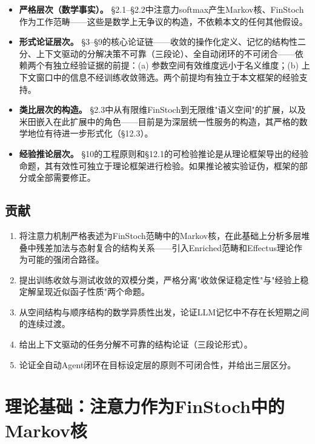 \documentclass[11pt,a4paper]{ctexart}
\begin{document}
\begin{itemize}[leftmargin=*]
    \item \textbf{严格层次（数学事实）。} §2.1--§2.2中注意力softmax产生Markov核、FinStoch作为工作范畴——这些是数学上无争议的构造，不依赖本文的任何其他假设。
    \item \textbf{形式论证层次。} §3--§9的核心论证链——收敛的操作化定义、记忆的结构性二分、上下文驱动的分解决策不可靠（三段论）、全自动闭环的不可闭合——依赖两个有独立经验证据的前提：(a) 参数空间有效维度远小于名义维度\cite{Li2018IntrinsicDim,Aghajanyan2020,Hu2021LoRA}；(b) 上下文窗口中的信息不经训练收敛筛选。两个前提均有独立于本文框架的经验支持。
    \item \textbf{类比层次的构造。} §2.3中从有限维FinStoch到无限维"语义空间"的扩展，以及米田嵌入在此扩展中的角色——目前是为深层统一性服务的构造，其严格的数学地位有待进一步形式化（§12.3）。
    \item \textbf{经验推论层次。} §10的工程原则和§12.1的可检验推论是从理论框架导出的经验命题，其有效性可独立于理论框架进行检验。如果推论被实验证伪，框架的部分或全部需要修正。
\end{itemize}

\subsection{贡献}

\begin{enumerate}[leftmargin=*,label=\textbf{C\arabic*}.]
    \item 将注意力机制严格表述为FinStoch范畴中的Markov核，在此基础上分析多层堆叠中残差加法与态射复合的结构关系——引入Enriched范畴和Effectus理论作为可能的强闭合路径。
    \item 提出训练收敛与测试收敛的双模分类，严格分离"收敛保证稳定性"与"经验上稳定解呈现近似函子性质"两个命题。
    \item 从空间结构与顺序结构的数学异质性出发，论证LLM记忆中不存在长短期之间的连续过渡。
    \item 给出上下文驱动的任务分解不可靠的结构论证（三段论形式）。
    \item 论证全自动Agent闭环在目标设定层的原则不可闭合性，并给出三层区分。
\end{enumerate}


\section{理论基础：注意力作为FinStoch中的Markov核}
\end{document}
